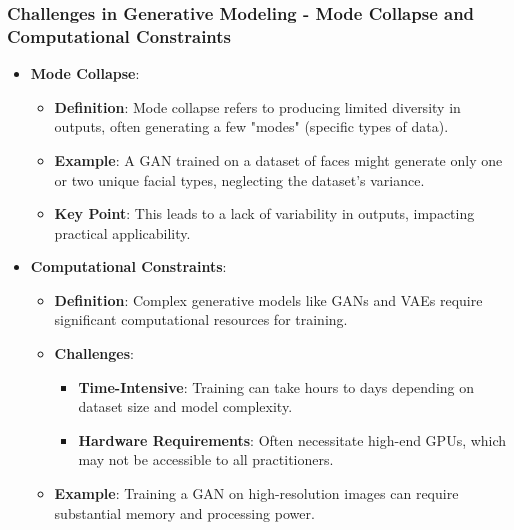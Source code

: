 \documentclass[aspectratio=169]{beamer}
\begin{document}
\begin{frame}[fragile]
  \frametitle{Challenges in Generative Modeling - Mode Collapse and Computational Constraints}
  
  \begin{itemize}
    \item \textbf{Mode Collapse}:
      \begin{itemize}
        \item \textbf{Definition}: Mode collapse refers to producing limited diversity in outputs, often generating a few "modes" (specific types of data).
        \item \textbf{Example}: A GAN trained on a dataset of faces might generate only one or two unique facial types, neglecting the dataset's variance.
        \item \textbf{Key Point}: This leads to a lack of variability in outputs, impacting practical applicability.
      \end{itemize}
    
    \item \textbf{Computational Constraints}:
      \begin{itemize}
        \item \textbf{Definition}: Complex generative models like GANs and VAEs require significant computational resources for training.
        \item \textbf{Challenges}: 
          \begin{itemize}
            \item \textbf{Time-Intensive}: Training can take hours to days depending on dataset size and model complexity.
            \item \textbf{Hardware Requirements}: Often necessitate high-end GPUs, which may not be accessible to all practitioners.
          \end{itemize}
        \item \textbf{Example}: Training a GAN on high-resolution images can require substantial memory and processing power.
      \end{itemize}
  \end{itemize}
\end{frame}
\end{document}
